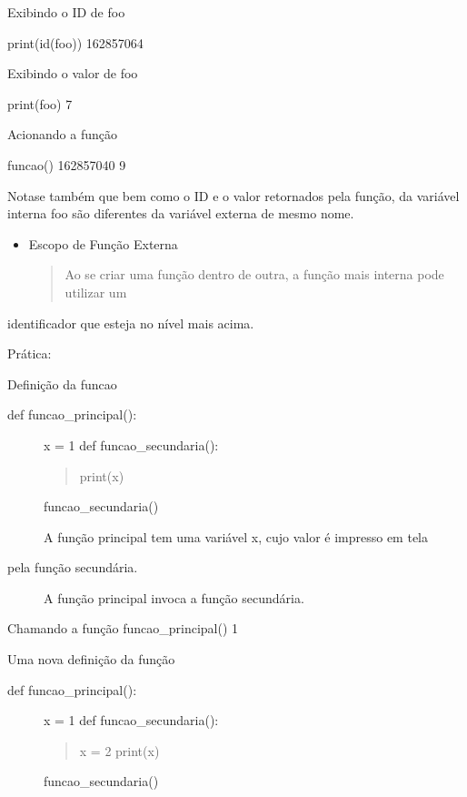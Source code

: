 \documentclass[letterpaper,10pt,brazil]{sphinxmanual}
\begin{document}
Exibindo o ID de foo

print(id(foo))
162857064

Exibindo o valor de foo

print(foo)
7

Acionando a função

funcao()
162857040
9

Nota\sphinxhyphen{}se também que bem como o ID e o valor retornados pela função,
da variável interna foo são diferentes da variável externa de mesmo nome.
\begin{itemize}
\item {} 
Escopo de Função Externa
\begin{quote}

Ao se criar uma função dentro de outra, a função mais interna pode utilizar um
\end{quote}

\end{itemize}

identificador que esteja no nível mais acima.

Prática:

Definição da funcao
\begin{description}
\item[{def funcao\_principal():}] \leavevmode
x = 1
def funcao\_secundaria():
\begin{quote}

print(x)
\end{quote}

funcao\_secundaria()

A função principal tem uma variável x, cujo valor é impresso em tela

\item[{pela função secundária.}] \leavevmode
A função principal invoca a função secundária.

\end{description}

Chamando a função
funcao\_principal()
1

Uma nova definição da função
\begin{description}
\item[{def funcao\_principal():}] \leavevmode
x = 1
def funcao\_secundaria():
\begin{quote}

x = 2
print(x)
\end{quote}

funcao\_secundaria()

\end{description}
\end{document}
